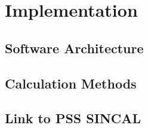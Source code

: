 \chapter{Implementation}

\section{Software Architecture}

\section{Calculation Methods}

\section{Link to PSS SINCAL}
\label{sec:link_sincal}